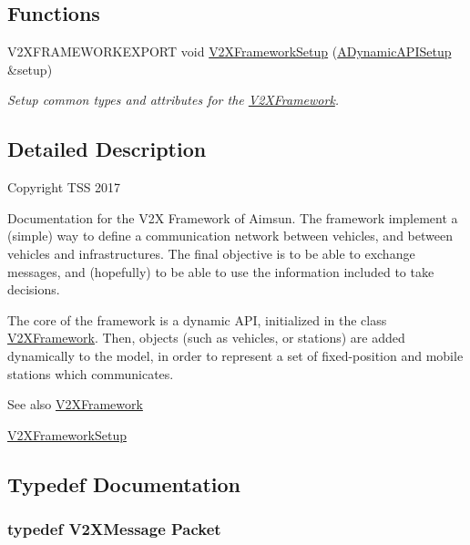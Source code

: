 \subsection*{Functions}
\begin{DoxyCompactItemize}
\item 
V2\+X\+F\+R\+A\+M\+E\+W\+O\+R\+K\+E\+X\+P\+O\+RT void \hyperlink{group__V2XFramework_ga6d11c55f2bd1624a8d08345abfd7f3a8}{V2\+X\+Framework\+Setup} (\hyperlink{classADynamicAPISetup}{A\+Dynamic\+A\+P\+I\+Setup} \&setup)
\begin{DoxyCompactList}\small\item\em Setup common types and attributes for the \hyperlink{classV2XFramework}{V2\+X\+Framework}. \end{DoxyCompactList}\end{DoxyCompactItemize}


\subsection{Detailed Description}
Copyright T\+SS 2017

Documentation for the V2X Framework of Aimsun. The framework implement a (simple) way to define a communication network between vehicles, and between vehicles and infrastructures. The final objective is to be able to exchange messages, and (hopefully) to be able to use the information included to take decisions.

The core of the framework is a dynamic A\+PI, initialized in the class \hyperlink{classV2XFramework}{V2\+X\+Framework}. Then, objects (such as vehicles, or stations) are added dynamically to the model, in order to represent a set of fixed-\/position and mobile stations which communicates.

\begin{DoxySeeAlso}{See also}
\hyperlink{classV2XFramework}{V2\+X\+Framework} 

\hyperlink{group__V2XFramework_ga6d11c55f2bd1624a8d08345abfd7f3a8}{V2\+X\+Framework\+Setup} 
\end{DoxySeeAlso}


\subsection{Typedef Documentation}
\subsubsection[{\texorpdfstring{Packet}{Packet}}]{\setlength{\rightskip}{0pt plus 5cm}typedef {\bf V2\+X\+Message} {\bf Packet}}\hypertarget{group__V2XFramework_ga1b82bfc289dbcb9aced56200d7abc964}{}\label{group__V2XFramework_ga1b82bfc289dbcb9aced56200d7abc964}


